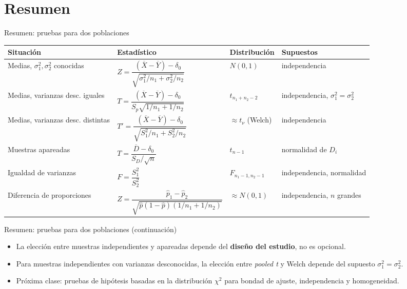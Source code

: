\documentclass[aspectratio=169,11pt]{beamer}
\begin{document}
\section{Resumen}

\begin{frame}{Resumen: pruebas para dos poblaciones}
\begin{table}[]
\centering
\scriptsize
\begin{tabular}{@{}p{3.0cm}p{3.9cm}p{2.6cm}p{2.9cm}@{}}
\toprule
Situación & Estadístico & Distribución & Supuestos \\
\midrule
Medias, $\sigma_1^2,\sigma_2^2$ conocidas & $Z=\dfrac{(\overline{X}-\overline{Y})-\delta_0}{\sqrt{\sigma_1^2/n_1+\sigma_2^2/n_2}}$ & $N(0,1)$ & independencia \\[1.4em]
Medias, varianzas desc. iguales & $T=\dfrac{(\overline{X}-\overline{Y})-\delta_0}{S_p\sqrt{1/n_1+1/n_2}}$ & $t_{n_1+n_2-2}$ & independencia, $\sigma_1^2=\sigma_2^2$ \\[1.4em]
Medias, varianzas desc. distintas & $T'=\dfrac{(\overline{X}-\overline{Y})-\delta_0}{\sqrt{S_1^2/n_1+S_2^2/n_2}}$ & $\approx t_{\nu}$ (Welch) & independencia \\[1.4em]
Muestras apareadas & $T=\dfrac{\overline{D}-\delta_0}{S_D/\sqrt{n}}$ & $t_{n-1}$ & normalidad de $D_i$ \\[1.2em]
Igualdad de varianzas & $F=\dfrac{S_1^2}{S_2^2}$ & $F_{n_1-1,n_2-1}$ & independencia, normalidad \\[1.2em]
Diferencia de proporciones & $Z=\dfrac{\hat p_1-\hat p_2}{\sqrt{\hat p(1-\hat p)(1/n_1+1/n_2)}}$ & $\approx N(0,1)$ & independencia, $n$ grandes \\
\bottomrule
\end{tabular}
\end{table}

\end{frame}

\begin{frame}{Resumen: pruebas para dos poblaciones (continuación)}
\begin{itemize}
\item La elección entre muestras independientes y apareadas depende del \textbf{diseño del estudio}, no es opcional.
\item Para muestras independientes con varianzas desconocidas, la elección entre \emph{pooled t} y Welch depende del supuesto $\sigma_1^2=\sigma_2^2$.
\item Próxima clase: pruebas de hipótesis basadas en la distribución $\chi^2$ para bondad de ajuste, independencia y homogeneidad.
\end{itemize}
\end{frame}
\end{document}
